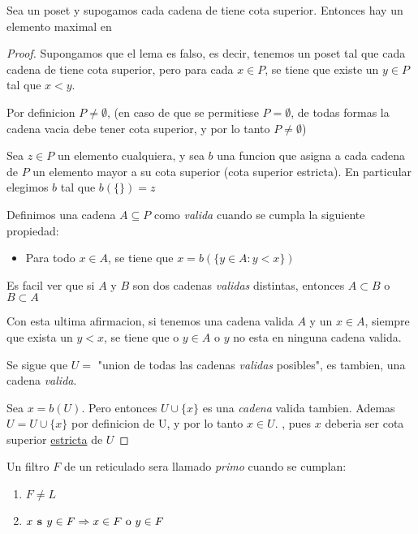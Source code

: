 \begin{lemma}[Zorn]
  Sea \poset un poset y supogamos cada cadena de \poset tiene cota superior. Entonces
  hay un elemento maximal en \poset
\end{lemma}
\begin{proof}
  Supongamos que el lema es falso, es decir, tenemos un poset \poset tal que cada cadena de \poset tiene cota superior, 
  pero para cada $x \in P$, se tiene que existe un $y \in P$ tal que $x < y$.

  Por definicion $P \neq \emptyset$, (en caso de que se permitiese $P = \emptyset$, de todas formas la cadena vacia debe tener cota superior, y por lo tanto $P \neq \emptyset$)

  Sea $z \in P$ un elemento cualquiera, y sea $b$ una funcion que asigna a cada cadena de $P$
  un elemento mayor a su cota superior (cota superior estricta).
  En particular elegimos $b$ tal que $b(\{\}) = z$

  Definimos una cadena $A \subseteq P$ como \emph{valida} cuando se cumpla la siguiente propiedad:
  \begin{itemize}
    \item Para todo $x \in A$, se tiene que $x = b(\{y \in A : y < x\})$
  \end{itemize}

  Es facil ver que si $A$ y $B$ son dos cadenas \emph{validas} distintas, entonces $A \subset B$ o $B \subset A$

  Con esta ultima afirmacion, si tenemos una cadena valida $A$ y un $x \in A$, siempre que exista un $y < x$,
  se tiene que o $y \in A$ o $y$ no esta en ninguna cadena valida.

  Se sigue que $U = $ "union de todas las cadenas \emph{validas} posibles", es tambien, una cadena \emph{valida}.

  Sea $x = b(U)$. Pero entonces $U \cup \{x\}$ es una \emph{cadena} valida tambien. Ademas $U = U \cup \{x\}$ por definicion de U, 
  y por lo tanto $x \in U$. \abs, pues $x$ deberia ser cota superior \underline{estricta} de $U$
\end{proof}

\begin{definition}
  Un filtro $F$ de un reticulado \reticulAlg sera llamado \emph{primo} cuando se cumplan:
  \begin{enumerate}
    \item $F \neq L$
    \item $x\textbf{ s }y \in F \Rightarrow x \in F \text{ o } y \in F$
  \end{enumerate}
\end{definition}

